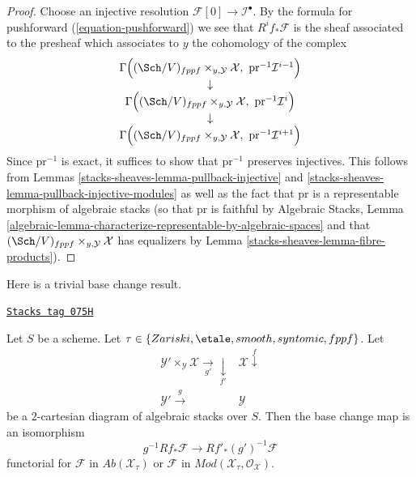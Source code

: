 \begin{proof}
Choose an injective resolution $\mathcal{F}[0] \to \mathcal{I}^\bullet$.
By the formula for pushforward (\ref{equation-pushforward}) we see that
$R^if_*\mathcal{F}$ is the sheaf associated to the presheaf which associates
to $y$ the cohomology of the complex
$$
\begin{matrix}
\Gamma\Big((\Sch/V)_{fppf} \times_{y, \mathcal{Y}} \mathcal{X},
\ \text{pr}^{-1}\mathcal{I}^{i - 1}\Big) \\
\downarrow \\
\Gamma\Big((\Sch/V)_{fppf} \times_{y, \mathcal{Y}} \mathcal{X},
\ \text{pr}^{-1}\mathcal{I}^i\Big) \\
\downarrow \\
\Gamma\Big((\Sch/V)_{fppf} \times_{y, \mathcal{Y}} \mathcal{X},
\ \text{pr}^{-1}\mathcal{I}^{i + 1}\Big)
\end{matrix}
$$
Since $\text{pr}^{-1}$ is exact, it suffices to show that
$\text{pr}^{-1}$ preserves injectives. This follows from
Lemmas \ref{stacks-sheaves-lemma-pullback-injective} and
\ref{stacks-sheaves-lemma-pullback-injective-modules}
as well as the fact that $\text{pr}$ is a representable morphism of
algebraic stacks (so that $\text{pr}$ is faithful by
Algebraic Stacks, Lemma
\ref{algebraic-lemma-characterize-representable-by-algebraic-spaces}
and that
$(\Sch/V)_{fppf} \times_{y, \mathcal{Y}} \mathcal{X}$
has equalizers by
Lemma \ref{stacks-sheaves-lemma-fibre-products}).
\end{proof}

Here is a trivial base change result.

\begin{lemma}
\label{stacks-sheaves-lemma-base-change-higher-direct-images}
\href{https://stacks.math.columbia.edu/tag/075H}{\texttt{Stacks tag 075H}}

Let $S$ be a scheme. Let
$\tau \in \{Zariski,\linebreak[0] \etale,\linebreak[0]
smooth,\linebreak[0] syntomic,\linebreak[0] fppf\}$. Let
$$
\begin{array}{cc}\mathcal{Y}' \times_\mathcal{Y} \mathcal{X} \underset{g'}{\longrightarrow}\underset{f'}{\downarrow} & \mathcal{X} \overset{f}{\downarrow} \\ \mathcal{Y}' \overset{g}{\longrightarrow} & \mathcal{Y}\end{array}
$$
be a $2$-cartesian diagram of algebraic stacks over $S$. Then the base change
map is an isomorphism
$$
g^{-1}Rf_*\mathcal{F} \longrightarrow Rf'_*(g')^{-1}\mathcal{F}
$$
functorial for $\mathcal{F}$ in $\textit{Ab}(\mathcal{X}_\tau)$
or $\mathcal{F}$ in $\textit{Mod}(\mathcal{X}_\tau, \mathcal{O}_\mathcal{X})$.
\end{lemma}

